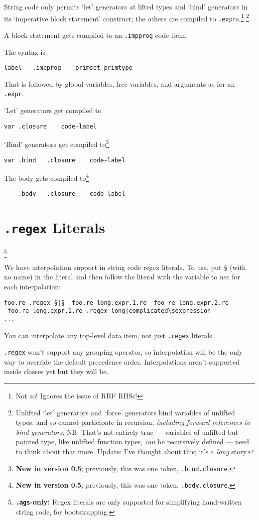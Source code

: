 \documentclass{report}
\newcommand\stringcode[1]{\texttt{#1}}
\newcommand\agsonly[1]{\footnote{\textbf{\texttt{.ags}-only: }#1}}
\newcommand\new[2]{\footnote{\textbf{New in version #1}; previously, #2}}
\begin{document}
String code only permits `let' generators at lifted types and `bind' generators in its `imperative block statement' construct;
the others are compiled to \verb+.expr+s.\footnote{Not so!  Ignores the issue of RRF RHSs!}
\footnote{
    Unlifted `let' generators and `force' generators bind variables of unlifted types,
    and so cannot participate in recursion,
    \emph{including forward references to bind generators}.
    NB: That's not entirely true --- variables of unlifted but pointed type, like unlifted function types,
    \emph{can} be recursively defined --- need to think about that more.
    Update: I've thought about this; it's a \emph{long} story.
}

A block statement gets compiled to an \verb+.impprog+ code item.

The syntax is
\begin{verbatim}
label	.impprog	primset	primtype
\end{verbatim}
That is followed by global variables, free variables, and arguments as for an \verb+.expr+.

`Let' generators get compiled to
\begin{verbatim}
var	.closure	code-label
\end{verbatim}
`Bind' generators get compiled to\new{0.5}{this was one token, \stringcode{.bind.closure}.}
\begin{verbatim}
var	.bind	.closure	code-label
\end{verbatim}
The body gets compiled to\new{0.5}{this was one token, \stringcode{.body.closure}.}
\begin{verbatim}
	.body	.closure	code-label
\end{verbatim}

\chapter{\stringcode{.regex} Literals}\agsonly{Regex literals are only supported for simplifying hand-written string code, for bootstrapping.}

We have interpolation support in string code regex literals.
To use, put \stringcode{§} (with no name) in the literal
and then follow the literal with the variable to use for each interpolation:
\begin{verbatim}
foo.re .regex §|§ _foo.re_long.expr.1.re _foo_re_long.expr.2.re
_foo.re_long.expr.1.re .regex long|complicated\sexpression
...
\end{verbatim}

You can interpolate any top-level data item, not just \stringcode{.regex} literals.

\stringcode{.regex} won't support any grouping operator,
so interpolation will be the only way to override the default precedence order.
Interpolations aren't supported inside classes yet but they will be.



\end{document}
